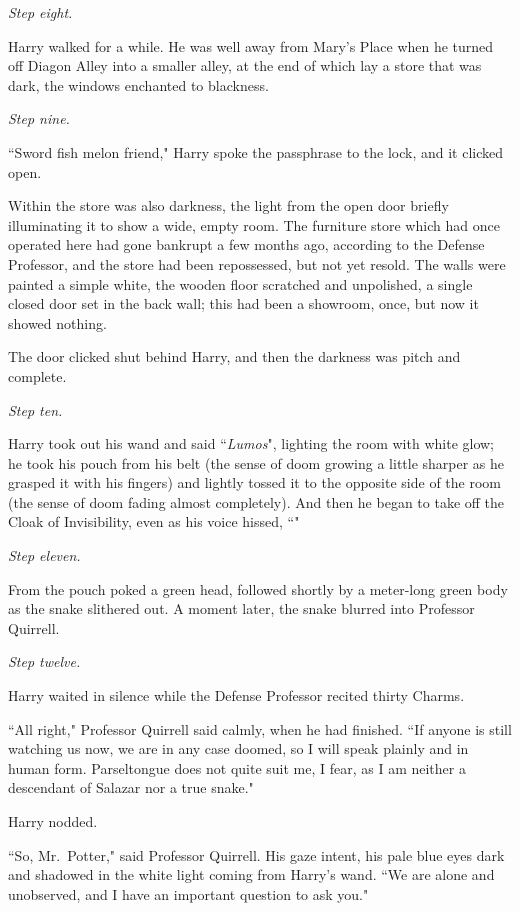 \emph{Step eight.}

Harry walked for a while. He was well away from Mary's Place when he turned off Diagon Alley into a smaller alley, at the end of which lay a store that was dark, the windows enchanted to blackness.

\emph{Step nine.}

``Sword fish melon friend," Harry spoke the passphrase to the lock, and it clicked open.

Within the store was also darkness, the light from the open door briefly illuminating it to show a wide, empty room. The furniture store which had once operated here had gone bankrupt a few months ago, according to the Defense Professor, and the store had been repossessed, but not yet resold. The walls were painted a simple white, the wooden floor scratched and unpolished, a single closed door set in the back wall; this had been a showroom, once, but now it showed nothing.

The door clicked shut behind Harry, and then the darkness was pitch and complete.

\emph{Step ten.}

Harry took out his wand and said ``\emph{Lumos}", lighting the room with white glow; he took his pouch from his belt (the sense of doom growing a little sharper as he grasped it with his fingers) and lightly tossed it to the opposite side of the room (the sense of doom fading almost completely). And then he began to take off the Cloak of Invisibility, even as his voice hissed, ``"

\emph{Step eleven.}

From the pouch poked a green head, followed shortly by a meter-long green body as the snake slithered out. A moment later, the snake blurred into Professor Quirrell.

\emph{Step twelve.}

Harry waited in silence while the Defense Professor recited thirty Charms.

``All right," Professor Quirrell said calmly, when he had finished. ``If anyone is still watching us now, we are in any case doomed, so I will speak plainly and in human form. Parseltongue does not quite suit me, I fear, as I am neither a descendant of Salazar nor a true snake."

Harry nodded.

``So, Mr.~Potter," said Professor Quirrell. His gaze intent, his pale blue eyes dark and shadowed in the white light coming from Harry's wand. ``We are alone and unobserved, and I have an important question to ask you."

